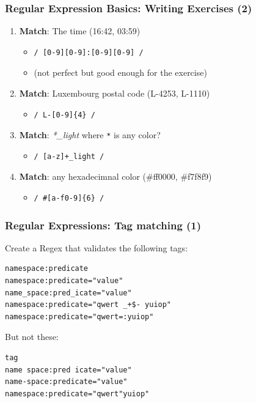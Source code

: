 \documentclass{beamer}
\begin{document}
\begin{frame}[fragile]
    \frametitle{Regular Expression Basics: Writing Exercises (2)}
    \begin{enumerate}
        \item \textbf{Match}: The time (16:42, 03:59)
        \pause
        \begin{itemize}
            \item[] \begin{verbatim}/ [0-9][0-9]:[0-9][0-9] /\end{verbatim}
            \item[] (not perfect but good enough for the exercise)
        \end{itemize}
        \item \textbf{Match}: Luxembourg postal code (L-4253, L-1110)
        \pause
        \begin{itemize}
            \item[] \begin{verbatim}/ L-[0-9]{4} /\end{verbatim}
        \end{itemize}
        \item \textbf{Match}: \textit{*\_light} where \texttt{*} is any color?
        \pause
        \begin{itemize}
            \item[] \begin{verbatim}/ [a-z]+_light /\end{verbatim}
        \end{itemize}
        \item \textbf{Match}: any hexadecimnal color (\#ff0000, \#f7f8f9)
        \pause
        \begin{itemize}
            \item[] \begin{verbatim}/ #[a-f0-9]{6} /\end{verbatim}
        \end{itemize}
    \end{enumerate}
\end{frame}

\begin{frame}[fragile]
    \frametitle{Regular Expressions: Tag matching (1)}
    Create a Regex that validates the following tags:
\begin{lstlisting}
namespace:predicate
namespace:predicate="value"
name_space:pred_icate="value"
namespace:predicate="qwert _+$- yuiop"
namespace:predicate="qwert=:yuiop"
\end{lstlisting}
    But not these:
\begin{lstlisting}
tag
name space:pred icate="value"
name-space:predicate="value"
namespace:predicate="qwert"yuiop"
\end{lstlisting}
\end{frame}
\end{document}
